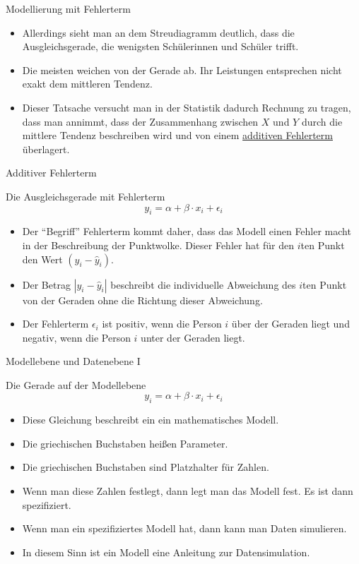 \documentclass[usenames,dvipsnames,handout]{beamer}
\begin{document}
\begin{frame}{Modellierung mit Fehlerterm }
\begin{itemize}
\item{Allerdings sieht man an dem Streudiagramm deutlich, 
dass die Ausgleichsgerade,
die wenigsten Schülerinnen und Schüler trifft. }\pause
\item{Die meisten weichen von der Gerade ab.
Ihr Leistungen entsprechen nicht exakt dem mittleren Tendenz.}\pause
\item{Dieser Tatsache versucht man in der Statistik dadurch Rechnung zu tragen, dass man annimmt,
dass der Zusammenhang zwischen $X$ und $Y$ durch die mittlere Tendenz beschreiben wird und
von einem \underline{additiven Fehlerterm} überlagert.}
\end{itemize}
\end{frame}

\begin{frame}{Additiver Fehlerterm}
\begin{block}{Die Ausgleichsgerade  mit Fehlerterm}
\begin{equation}
\label{eq:2}
y_{i} = \alpha + \beta \cdot x_{i} +\epsilon_{i}
\end{equation}
\end{block}
\begin{itemize}
\item{Der ``Begriff'' Fehlerterm kommt daher, dass das Modell einen Fehler macht in
der Beschreibung der Punktwolke. Dieser Fehler hat für den $i$ten Punkt den Wert $(y_{i}-\hat{y}_{i}).$}\pause
\item{Der Betrag $|y_{i}-\hat{y}_{i}|$ beschreibt die individuelle Abweichung des $i$ten Punkt
von der Geraden ohne die Richtung dieser Abweichung.}\pause
\item{Der Fehlerterm $\epsilon_{i}$ ist positiv, wenn die Person $i$ über der Geraden liegt und 
negativ, wenn die Person $i$ unter der Geraden liegt.}\pause
\end{itemize}
\end{frame}
\begin{frame}{Modellebene und  Datenebene I}
\begin{block}{Die Gerade auf der Modellebene}
$$
y_{i} = \alpha + \beta \cdot x_{i} +\epsilon_{i}
$$
\end{block}
\begin{itemize}
\item{Diese Gleichung beschreibt ein ein mathematisches 
Modell.}\pause
\item{Die griechischen Buchstaben heißen Parameter.}\pause
\item{Die griechischen Buchstaben sind Platzhalter für
Zahlen. }\pause
\item{Wenn man diese Zahlen festlegt, dann
legt man das Modell fest. Es ist dann spezifiziert.}\pause
\item{Wenn man ein spezifiziertes Modell hat,
dann kann man Daten simulieren.}\pause
\item{In diesem Sinn ist ein Modell eine Anleitung
zur Datensimulation.}
\end{itemize}
\end{frame}
\end{document}
